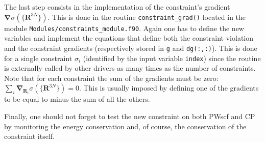 \documentclass[a4paper,12pt,notitlepage]{report}
\newcommand{\Rb}{\mathbf R}
\newcommand{\nb}{\boldsymbol \nabla}
\begin{document}
The last step consists in the implementation of the constraint's gradient
$\nb\sigma(\{\Rb^{3N}\})$. This is done in the routine
\texttt{constraint\_grad()} located in the module
\texttt{Modules/constraints\_module.f90}. Again one has to define the new
variables and implement the equations that define both the constraint violation
and the constraint gradients (respectively stored in \texttt{g} and
\texttt{dg(:,:)}). This is done for a single constraint $\sigma_i$ (identified
by the input variable \texttt{index}) since the routine is externally called by
other drivers as many times as the number of constraints. Note that for each
constraint the sum of the gradients must be zero: $\sum_{i}
\nb_{\Rb_i}\sigma(\{\Rb^{3N}\}) = 0$. This is usually imposed by defining one of
the gradients to be equal to minus the sum of all the others.

Finally, one should not forget to test the new constraint on both PWscf and CP
by monitoring the energy conservation and, of course, the conservation of the
constraint itself.
\end{document}
